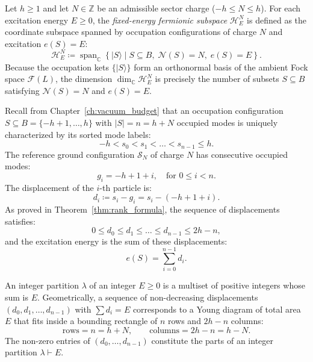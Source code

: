 \begin{definition}
Let $h \ge 1$ and let $N \in \mathbb{Z}$ be an admissible sector charge ($-h \le N \le h$). For each excitation energy $E \ge 0$, the \emph{fixed-energy fermionic subspace} $\mathcal{H}^N_E$ is defined as the coordinate subspace spanned by occupation configurations of charge $N$ and excitation $e(S) = E$:
\begin{equation}
\mathcal{H}^N_E \coloneqq \operatorname{span}_{\mathbb{C}} \left\{ |S\rangle \mid S \subseteq B,\; \mathcal{N}(S) = N,\; e(S) = E \right\}.
\end{equation}
Because the occupation kets $\{|S\rangle\}$ form an orthonormal basis of the ambient Fock space $\mathcal{F}(L)$, the dimension $\dim_{\mathbb{C}} \mathcal{H}^N_E$ is precisely the number of subsets $S \subseteq B$ satisfying $\mathcal{N}(S) = N$ and $e(S) = E$.
\end{definition}

Recall from Chapter~\ref{ch:vacuum_budget} that an occupation configuration $S \subseteq B = \{-h+1, \dots, h\}$ with $|S| = n = h + N$ occupied modes is uniquely characterized by its sorted mode labels:
\begin{equation}
-h < s_0 < s_1 < \dots < s_{n-1} \le h.
\end{equation}
The reference ground configuration $\mathcal{S}_N$ of charge $N$ has consecutive occupied modes:
\begin{equation}
g_i = -h + 1 + i, \quad \text{for } 0 \le i < n.
\end{equation}
The displacement of the $i$-th particle is:
\begin{equation}
d_i \coloneqq s_i - g_i = s_i - (-h + 1 + i).
\end{equation}
As proved in Theorem~\ref{thm:rank_formula}, the sequence of displacements satisfies:
\begin{equation}
0 \le d_0 \le d_1 \le \dots \le d_{n-1} \le 2h - n,
\end{equation}
and the excitation energy is the sum of these displacements:
\begin{equation}
e(S) = \sum_{i=0}^{n-1} d_i.
\end{equation}

\begin{definition}
An integer partition $\lambda$ of an integer $E \ge 0$ is a multiset of positive integers whose sum is $E$.
Geometrically, a sequence of non-decreasing displacements $(d_0, d_1, \dots, d_{n-1})$ with $\sum d_i = E$ corresponds to a Young diagram of total area $E$ that fits inside a bounding rectangle of $n$ rows and $2h - n$ columns:
\begin{equation}
\text{rows} = n = h + N, \qquad \text{columns} = 2h - n = h - N.
\end{equation}
The non-zero entries of $(d_0, \dots, d_{n-1})$ constitute the parts of an integer partition $\lambda \vdash E$.
\end{definition}

